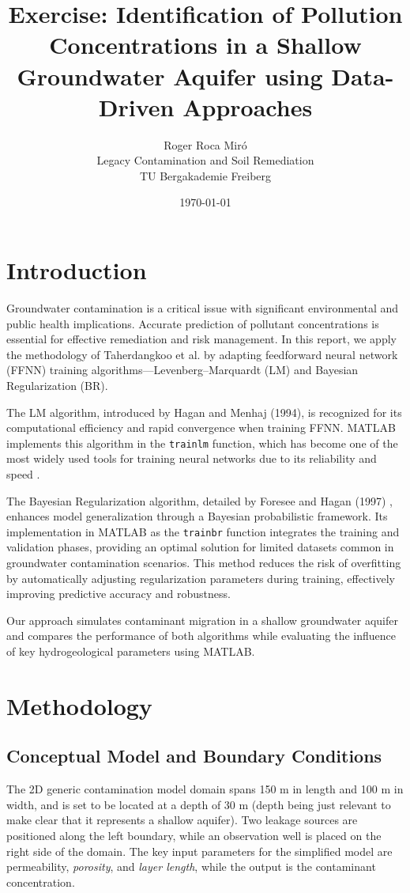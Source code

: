 \documentclass[10pt]{article}
\title{Exercise: Identification of Pollution Concentrations in a Shallow Groundwater Aquifer using Data-Driven Approaches}
\author{Roger Roca Miró \\ Legacy Contamination and Soil Remediation \\ TU Bergakademie Freiberg}
\date{\today}
\begin{document}
	
	\maketitle
	
	\section{Introduction}
	Groundwater contamination is a critical issue with significant environmental and public health implications. Accurate prediction of pollutant concentrations is essential for effective remediation and risk management. In this report, we apply the methodology of Taherdangkoo et al. \cite{taherdangkoo2020} by adapting feedforward neural network (FFNN) training algorithms—Levenberg–Marquardt (LM) and Bayesian Regularization (BR).

	The LM algorithm, introduced by Hagan and Menhaj (1994), is recognized for its computational efficiency and rapid convergence when training FFNN. MATLAB implements this algorithm in the \texttt{trainlm} function, which has become one of the most widely used tools for training neural networks due to its reliability and speed \cite{hagan1994,matlab}.

	The Bayesian Regularization algorithm, detailed by Foresee and Hagan (1997) \cite{foresee1997,matlab}, enhances model generalization through a Bayesian probabilistic framework. Its implementation in MATLAB as the \texttt{trainbr} function integrates the training and validation phases, providing an optimal solution for limited datasets common in groundwater contamination scenarios. This method reduces the risk of overfitting by automatically adjusting regularization parameters during training, effectively improving predictive accuracy and robustness.

	Our approach simulates contaminant migration in a shallow groundwater aquifer and compares the performance of both algorithms while evaluating the influence of key hydrogeological parameters using MATLAB.
	
	\section{Methodology}
	\subsection{Conceptual Model and Boundary Conditions}
	The 2D generic contamination model domain spans 150 m in length and 100 m in width, and is set to be located at a depth of 30 m (depth being just relevant to make clear that it represents a shallow aquifer). Two leakage sources are positioned along the left boundary, while an observation well is placed on the right side of the domain. The key input parameters for the simplified model are permeability, \textit{porosity}, and \textit{layer length}, while the output is the contaminant concentration.
	
\end{document}
